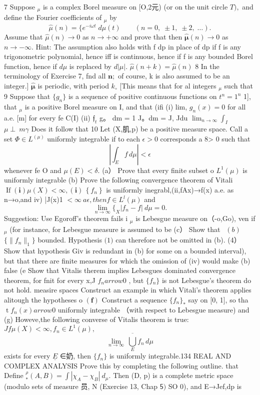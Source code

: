 7 Suppose ${}_{\!\mu}$ is a complex Borel measure on [O,2元) (or on the unit circle $T),$ and define the Fourier coefficients of ${}_{\mu}$ by $$ \hat{\mu}(n)= \{e^{-i\omega t}\;d\mu(t)\qquad(n=0,\;\pm1,\;\pm2,\;\ldots). $$ Assume that ${\hat{\mu}}(n)\to0$ as $n\to+\infty$ and prove that then ${\hat{\boldsymbol{\mu}}}(n)\to0$ as $n\to-\infty.$ Hint: The assumption also holds with f dp in place of dp if f is any trigonometric polynomial, hence iff is continuous, hence if f is any bounded Borel function, hence if ${\mathit{d\mu}}$ is replaced by $d|\mu|.$ ${\hat{\mu}}(n+k)={\hat{\mu}}(n)$ 8 In the terminology of Exercise 7, fnd all ${\boldsymbol{n}};$ of course, k is also assumed to be an integer.] $\boldsymbol{\hat{\mu}}$ is periodic, with period $k_{\circ}$ [This means that for al integers ${}_{\!\mu}$ such that 9 Suppose that $\{g_{n}\}$ is a sequence of positive continuous functions on $\scriptstyle t^{n}=1^{n}$ 1], that ${}_{\mu}$ is a positive Borel measure on I, and that (ifi (i) lim, $g_{n}(x)=0$ for all a.e. [m] for every fe C(I) (ii) ${\mathfrak{f}}_{t}$ g。 dm = 1 J。dm = J, Jdu $\operatorname*{lim}_{n\to\infty}\left.\int_{I}\right.$ $\mu\perp\ m\gamma$ Does it follow that 10 Let (X,肌,p) be a positive measure space. Call a set $\Phi\in L^{\left(\mu\right)}$ uniformly integrable if to each $\epsilon>0$ corresponds a 8> 0 such that $$ \left|\int_{E}f\,d\mu\right|<\epsilon $$ whenever fe O and $\mu(E)<\delta.$ (a） Prove that every finite subset o $L^{1}(\mu)$ is uniformly integrable (b) Prove the following convergence theorem of Vitali $\operatorname{If}\left(\mathbf{i}\right)\mu(X)<\infty,\left(\mathbf{i}\right)\,\left\{f_{n}\right\}$ is uniformly inegrabl,(ii,fAx)→f(x) a.e. as n→o,and iv) |J(x)1 $<\infty\ a\epsilon,t h e n f\in L^{l}(\mu)$ and $$ \operatorname*{lim}_{n\to\infty} \{_{X}|f_{n}-f|\ d\mu=0. $$ Suggestion: Use Egoroff's theorem fails i ${}_{\!\mu}$ is Lebesgue measure on（-o,Go), ven if ${}_{\mu}$ (for instance, for Lebesgue measure is assumed to be (c） Show that ${\ \ \left(b\right)}$ $\{\|f_{n}\|_{1}\}$ bounded. Hypothesis $\mathbf{(}1)$ can therefore not be omitted in (b). (4） Show that hypothesis Giv is redundant in (b) for some on a bounded interval), but that there are finite measures for which the omission of (iv) would make (b) false (e Show that Vitalis therem implies Lebesgues dominated convergence theorem, for fnit for every x,J $f_{n} arrow0$ , but $\{f_{n}\}$ is not Lebesgue's theorem do not hold. measire spaces Construct an example in which Vitali's theorem applies alitough the hypotheses o $\mathbf{(f)}$ Construct a sequence $\{f_{n}\}_{*}$ say on [0, 1], so tha $\operatorname{t}f_{n}(x) arrow0$ uniformly integrable （with respect to Lebesgue measure) and (g) Howeve,the following converse of Vitalis theorem is true: $J f\mu(X)<\infty{,}f_{n}\in L^{1}(\mu),$ $$ \operatorname*{lim}_{n\to\infty}\ {\overline{{\bigcup_{E}}}}f_{n}\,d\mu $$ exists for every $\underline{{E}}$ ∈奶, then $\{f_{n}\}$ is uniformly integrable.134 REAL AND COMPLEX ANALYSIS Prove this by completing the following outline. that Define $_{*}^{\rho}(A,B)=\int|\chi_{A}-\chi_{B}|\ d_{\mu}.$ Then (D, p) is a complete metric space (modulo sets of measure 员, N (Exercise 13, Chap ${\mathsf{5}})$ SO 0), and E→Jef,dp is 